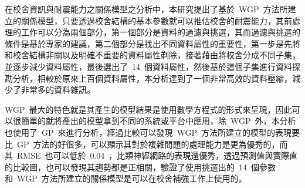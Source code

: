 在校舍資訊與耐震能力之關係模型之分析中，本研究提出了基於~WGP~方法所建立的關係模型，只要透過校舍結構的基本參數就可以推估校舍的耐震能力，其前處理的工作可以分為兩個部分，第一個部分是資料的過濾與挑選，其而過濾與挑選的條件是基於專家的建議，第二個部分是找出不同資料屬性的重要性，第一步是先將和校舍結構非關以及明確不重要的資料屬性剃除，接著藉由將校舍分成不同子集，並逐步減少資料屬性，最後選出了~14~個資料屬性，然後基於這個子集進行資料探勘分析，相較於原來上百個資料屬性，本分析達到了一個非常高效的資料壓縮，減少了非常多的資料雜訊。


WGP~最大的特色就是其產生的模型結果是使用數學方程式的形式來呈現，因此可以很簡單的就將產出的模型拿到不同的系統或平台中應用，除~WGP~外，本分析也使用了~GP~來進行分析，經過比較可以發現~WGP~方法所建立的模型的表現要比~GP~方法的好很多，可以顯示其對於複雜問題的處理能力是更為優秀的，而其~RMSE~也可以低於~0.04~，比類神經網路的表現還優秀，透過預測值與實際直的比較圖，也可以發現其趨勢都是正相關，驗證了使用挑選出的~14~個參數和~WGP~方法所建立的關係模型是可以在校舍補強工作上使用的。

